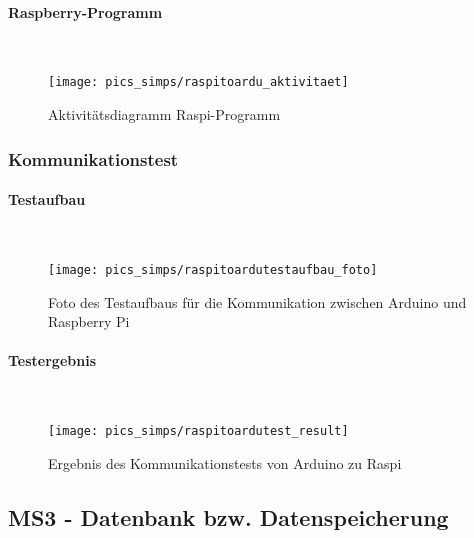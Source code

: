 \documentclass[12pt,a4paper]{article}
\begin{document}
\paragraph{Raspberry-Programm}\mbox{}\\
\begin{figure}[h!]
	\centering
	\texttt{[image: pics\_simps/raspitoardu\_aktivitaet]}
	\caption{Aktivitätsdiagramm Raspi-Programm}
\end{figure}
%
%
\newpage
\subsubsection{Kommunikationstest}
\paragraph{Testaufbau}\mbox{}\\
\begin{figure}[h!]
	\centering
	\texttt{[image: pics\_simps/raspitoardutestaufbau\_foto]}
	\caption{Foto des Testaufbaus für die Kommunikation zwischen Arduino und Raspberry Pi}
\end{figure}
%
%
\newpage
\paragraph{Testergebnis}\mbox{}\\
\begin{figure}[h!]
	\centering
	\texttt{[image: pics\_simps/raspitoardutest\_result]}
	\caption{Ergebnis des Kommunikationstests von Arduino zu Raspi}
\end{figure}
%
%
\newpage
\subsection{MS3 - Datenbank bzw. Datenspeicherung}
\end{document}
